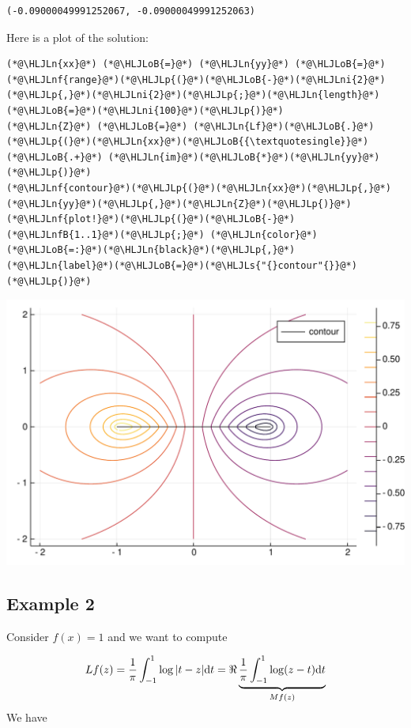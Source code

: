 \documentclass[12pt,a4paper]{article}
\newcommand{\HLJLn}[1]{#1}
\newcommand{\HLJLnf}[1]{\textcolor[RGB]{66,102,213}{#1}}
\newcommand{\HLJLs}[1]{\textcolor[RGB]{201,61,57}{#1}}
\newcommand{\HLJLnfB}[1]{\textcolor[RGB]{59,151,46}{#1}}
\newcommand{\HLJLni}[1]{\textcolor[RGB]{59,151,46}{#1}}
\newcommand{\HLJLoB}[1]{\textcolor[RGB]{102,102,102}{\textbf{#1}}}
\newcommand{\HLJLp}[1]{#1}
\def\D{ {\rm d} }
\begin{document}
\begin{lstlisting}
(-0.09000049991252067, -0.09000049991252063)
\end{lstlisting}


Here is a plot of the solution:


\begin{lstlisting}
(*@\HLJLn{xx}@*) (*@\HLJLoB{=}@*) (*@\HLJLn{yy}@*) (*@\HLJLoB{=}@*) (*@\HLJLnf{range}@*)(*@\HLJLp{(}@*)(*@\HLJLoB{-}@*)(*@\HLJLni{2}@*)(*@\HLJLp{,}@*)(*@\HLJLni{2}@*)(*@\HLJLp{;}@*)(*@\HLJLn{length}@*)(*@\HLJLoB{=}@*)(*@\HLJLni{100}@*)(*@\HLJLp{)}@*)
(*@\HLJLn{Z}@*) (*@\HLJLoB{=}@*) (*@\HLJLn{Lf}@*)(*@\HLJLoB{.}@*)(*@\HLJLp{(}@*)(*@\HLJLn{xx}@*)(*@\HLJLoB{{\textquotesingle}}@*) (*@\HLJLoB{.+}@*) (*@\HLJLn{im}@*)(*@\HLJLoB{*}@*)(*@\HLJLn{yy}@*)(*@\HLJLp{)}@*)
(*@\HLJLnf{contour}@*)(*@\HLJLp{(}@*)(*@\HLJLn{xx}@*)(*@\HLJLp{,}@*)(*@\HLJLn{yy}@*)(*@\HLJLp{,}@*)(*@\HLJLn{Z}@*)(*@\HLJLp{)}@*)
(*@\HLJLnf{plot!}@*)(*@\HLJLp{(}@*)(*@\HLJLoB{-}@*)(*@\HLJLnfB{1..1}@*)(*@\HLJLp{;}@*) (*@\HLJLn{color}@*)(*@\HLJLoB{=:}@*)(*@\HLJLn{black}@*)(*@\HLJLp{,}@*) (*@\HLJLn{label}@*)(*@\HLJLoB{=}@*)(*@\HLJLs{"{}contour"{}}@*)(*@\HLJLp{)}@*)
\end{lstlisting}

\includegraphics[width=\linewidth]{figures/Lecture18_2_1.pdf}

\subsection{Example 2}
Consider $f(x) = 1$ and we want to compute

\[
L f(z) = {1 \over \pi} \int_{-1}^1 \log|t-z| \D t = \Re \underbrace{{1 \over \pi} \int_{-1}^1 \log(z-t) \D t }_{M f(z)}
\]
We have 
\end{document}
